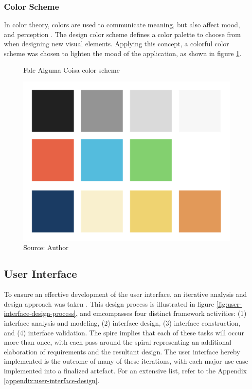 \subsubsection{Color Scheme}

In color theory, colors are used to communicate meaning, but also affect mood, and perception \cite{agoston2013color}. The design color scheme defines a color palette to choose from when designing new visual elements. Applying this concept, a colorful color scheme was chosen to lighten the mood of the application, as shown in figure \ref{fig:falealgumacoisa-color-scheme}.

\begin{figure}[h]
    \centering
    \caption{Fale Alguma Coisa color scheme}
     \includegraphics[width=.5\linewidth]{images/app/colors.png}
    \caption*{Source: Author}
    \label{fig:falealgumacoisa-color-scheme}
\end{figure}

\subsection{User Interface}
\label{sec:app-user-interface}

To ensure an effective development of the user interface, an iterative analysis and design approach was taken \cite{pressman2014software}. This design process is illustrated in figure \ref{fig:user-interface-design-process}, and emcompasses four distinct framework activities: (1) interface analysis and modeling, (2) interface design, (3) interface construction, and (4) interface validation. The spire implies that each of these tasks will occur more than once, with each pass around the spiral representing an additional elaboration of requirements and the resultant design. The user interface hereby implemented is the outcome of many of these iterations, with each major use case implemented into a finalized artefact. For an extensive list, refer to the Appendix \ref{appendix:user-interface-design}.

